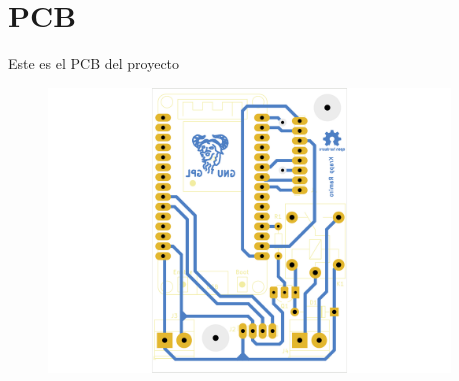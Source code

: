 \documentclass[../informe_krapp.tex]{subfiles}
\begin{document}
\graphicspath{{../images/}}
\section{PCB}
Este es el PCB del proyecto
\begin{figure}[H]
	\centering
	\includegraphics[width=0.95\textwidth]{pcb.pdf}
\end{figure}
\end{document}
